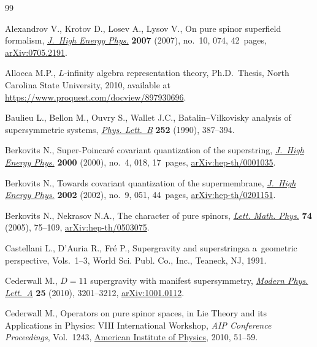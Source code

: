 \begin{thebibliography}{99}
\footnotesize\itemsep=0pt

Alexandrov V., Krotov D., Losev A., Lysov V., On pure spinor superfield
 formalism, \href{https://doi.org/10.1088/1126-6708/2007/10/074}{\textit{J.~High Energy Phys.}} \textbf{2007} (2007), no.~10, 074,
 42~pages, \href{https://arxiv.org/abs/0705.2191}{arXiv:0705.2191}.

Allocca M.P., $L$-infinity algebra representation theory, Ph.D.~Thesis,
 {N}orth Carolina State University, 2010, available at
 \url{https://www.proquest.com/docview/897930696}.

Baulieu L., Bellon M., Ouvry S., Wallet J.C., Batalin--{V}ilkovisky analysis of
 supersymmetric systems, \href{https://doi.org/10.1016/0370-2693(90)90557-M}{\textit{Phys. Lett.~B}} \textbf{252} (1990), 387--394.

Berkovits N., Super-{P}oincar\'e covariant quantization of the superstring,
 \href{https://doi.org/10.1088/1126-6708/2000/04/018}{\textit{J.~High Energy Phys.}} \textbf{2000} (2000), no.~4, 018, 17~pages,
 \href{https://arxiv.org/abs/hep-th/0001035}{arXiv:hep-th/0001035}.

Berkovits N., Towards covariant quantization of the supermembrane,
 \href{https://doi.org/10.1088/1126-6708/2002/09/051}{\textit{J.~High Energy Phys.}} \textbf{2002} (2002), no.~9, 051, 44~pages,
 \href{https://arxiv.org/abs/hep-th/0201151}{arXiv:hep-th/0201151}.

Berkovits N., Nekrasov N.A., The character of pure spinors, \href{https://doi.org/10.1007/s11005-005-0009-7}{\textit{Lett. Math.
 Phys.}} \textbf{74} (2005), 75--109, \href{https://arxiv.org/abs/hep-th/0503075}{arXiv:hep-th/0503075}.

Castellani L., D'Auria R., Fr\'e P., Supergravity and superstringsa a~geometric
 perspective, {V}ols.~1--3, World Sci. Publ. Co., Inc., Teaneck, NJ, 1991.

Cederwall M., {$D=11$} supergravity with manifest supersymmetry, \href{https://doi.org/10.1142/S0217732310034407}{\textit{Modern
 Phys. Lett.~A}} \textbf{25} (2010), 3201--3212, \href{https://arxiv.org/abs/1001.0112}{arXiv:1001.0112}.

Cederwall M., Operators on pure spinor spaces, in Lie Theory and its
 Applications in Physics: {VIII} International Workshop, \textit{AIP
 Conference Proceedings}, Vol.~1243, \href{https://doi.org/10.1063/1.3460180}{American Institute of Physics}, 2010,
 51--59.


\end{thebibliography}
